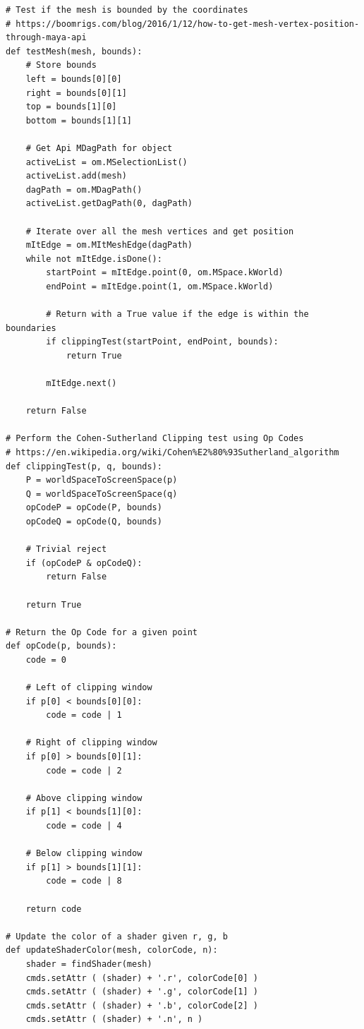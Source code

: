\documentclass[conference]{IEEEtran}
\begin{document}
{\begin{verbatim}
# Test if the mesh is bounded by the coordinates
# https://boomrigs.com/blog/2016/1/12/how-to-get-mesh-vertex-position-through-maya-api
def testMesh(mesh, bounds):    
    # Store bounds
    left = bounds[0][0]
    right = bounds[0][1]
    top = bounds[1][0]
    bottom = bounds[1][1]
    
    # Get Api MDagPath for object
    activeList = om.MSelectionList()
    activeList.add(mesh)
    dagPath = om.MDagPath()
    activeList.getDagPath(0, dagPath)

    # Iterate over all the mesh vertices and get position
    mItEdge = om.MItMeshEdge(dagPath)
    while not mItEdge.isDone():    	
        startPoint = mItEdge.point(0, om.MSpace.kWorld)
        endPoint = mItEdge.point(1, om.MSpace.kWorld)
        
        # Return with a True value if the edge is within the boundaries
        if clippingTest(startPoint, endPoint, bounds):
            return True
                
        mItEdge.next()
    
    return False
    
# Perform the Cohen-Sutherland Clipping test using Op Codes
# https://en.wikipedia.org/wiki/Cohen%E2%80%93Sutherland_algorithm
def clippingTest(p, q, bounds):
    P = worldSpaceToScreenSpace(p)
    Q = worldSpaceToScreenSpace(q)
    opCodeP = opCode(P, bounds)
    opCodeQ = opCode(Q, bounds)
        
    # Trivial reject
    if (opCodeP & opCodeQ):
        return False
        
    return True

# Return the Op Code for a given point
def opCode(p, bounds):
    code = 0
    
    # Left of clipping window
    if p[0] < bounds[0][0]:
        code = code | 1
    
    # Right of clipping window
    if p[0] > bounds[0][1]:
        code = code | 2
        
    # Above clipping window
    if p[1] < bounds[1][0]:
        code = code | 4
        
    # Below clipping window
    if p[1] > bounds[1][1]:
        code = code | 8
        
    return code
    
# Update the color of a shader given r, g, b
def updateShaderColor(mesh, colorCode, n):
    shader = findShader(mesh)
    cmds.setAttr ( (shader) + '.r', colorCode[0] )
    cmds.setAttr ( (shader) + '.g', colorCode[1] )
    cmds.setAttr ( (shader) + '.b', colorCode[2] ) 
    cmds.setAttr ( (shader) + '.n', n ) 
    

\end{verbatim}}
\end{document}
